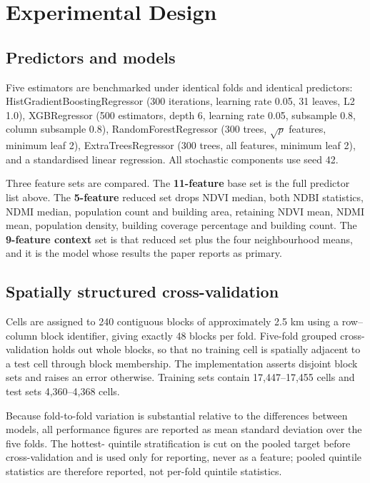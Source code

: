 \section{Experimental Design}\label{v.-experimental-design}

\subsection{Predictors and models}\label{a.-predictors-and-models}

Five estimators are benchmarked under identical folds and identical predictors:
HistGradientBoostingRegressor (300 iterations, learning rate 0.05, 31 leaves, L2 1.0),
XGBRegressor (500 estimators, depth 6, learning rate 0.05, subsample 0.8, column subsample 0.8),
RandomForestRegressor (300 trees, \(\sqrt{p}\) features, minimum leaf 2), ExtraTreesRegressor (300
trees, all features, minimum leaf 2), and a standardised linear regression. All stochastic components
use seed 42.

Three feature sets are compared. The \textbf{11-feature} base set is the full predictor list above. The
\textbf{5-feature} reduced set drops NDVI median, both NDBI statistics, NDMI median, population count and
building area, retaining NDVI mean, NDMI mean, population density, building coverage percentage and
building count. The \textbf{9-feature context} set is that reduced set plus the four neighbourhood means,
and it is the model whose results the paper reports as primary.

\subsection{Spatially structured cross-validation}\label{b.-spatially-structured-cross-validation}

Cells are assigned to 240 contiguous blocks of approximately 2.5 km using a row--column block
identifier, giving exactly 48 blocks per fold. Five-fold grouped cross-validation holds out whole
blocks, so that no training cell is spatially adjacent to a test cell through block membership. The
implementation asserts disjoint block sets and raises an error otherwise. Training sets contain
17,447--17,455 cells and test sets 4,360--4,368 cells.

Because fold-to-fold variation is substantial relative to the differences between models, all
performance figures are reported as mean \textpm{} standard deviation over the five folds. The hottest-
quintile stratification is cut on the pooled target before cross-validation and is used only for
reporting, never as a feature; pooled quintile statistics are therefore reported, not per-fold
quintile statistics.

